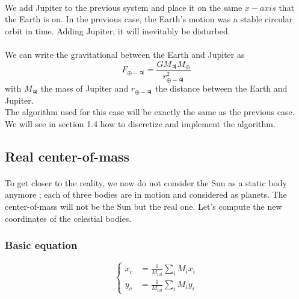 \documentclass[a4paper, twoside, 11pt]{report}
\theoremstyle{theorem}
\theoremstyle{remark}
\theoremstyle{exemple}
\begin{document}
            \paragraph{}We add Jupiter to the previous system and place it on the same $x-axis$ that the Earth is on. In the previous case, the Earth's motion was a stable circular orbit in time. Adding Jupiter, it will inevitably be disturbed.
        
            \paragraph{}We can write the gravitational between the Earth and Jupiter as 
                \begin{equation*}
                    F_{\oplus-\jupiter} = \frac{GM_{\jupiter}M_{\oplus}}{r_{\oplus-\jupiter}^2} 
                \end{equation*}
            with $M_{\jupiter}$ the mass of Jupiter and $r_{\oplus - \jupiter}$ the distance between the Earth and Jupiter. \\
            The algorithm used for this case will be exactly the same as the previous case. We will see in section 1.4 how to discretize and implement the algorithm. 
            
        \subsection{Real center-of-mass}
        
            \paragraph{}To get closer to the reality, we now do not consider the Sun as a static body anymore ; each of three bodies are in motion and considered as planets. The center-of-mass will not be the Sun but the real one. Let's compute the new coordinates of the celestial bodies.
            
            \subsubsection{Basic equation}
            
                \begin{equation}
                    \left\{
                        \begin{aligned}
                    x_c &= \frac{1}{M_{tot}}\sum\limits_{i} M_i x_i\\
                    y_c &= \frac{1}{M_{tot}}\sum\limits_{i} M_i y_i
                \end{aligned}
                    \right.
                \tag{6}
                \end{equation} 
            
\end{document}
